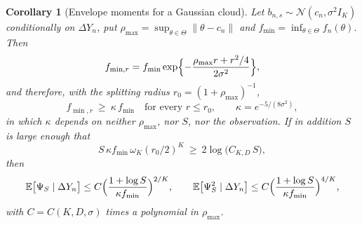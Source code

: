 \documentclass[11pt]{article}
\newtheorem{corollary}[corollary]{Corollary}
\theoremstyle{definition}
\newcommand{\E}{\mathbb{E}}
\newcommand{\Normal}{\mathcal{N}}
\begin{document}
\begin{corollary}[Envelope moments for a Gaussian cloud]\label{cor:envelope_moments}
Let $b_{n,s}\sim\Normal(c_n,\sigma^2I_K)$ conditionally on $\Delta Y_n$, put $\rho_{\max}=\sup_{\theta\in\Theta}\lVert\theta-c_n\rVert$ and $f_{\min}=\inf_{\theta\in\Theta}f_n(\theta)$. Then
\begin{equation}\label{eq:covering_gaussian}
f_{\min,r}=f_{\min}\exp\Bigl\{-\frac{\rho_{\max}r+r^2/4}{2\sigma^2}\Bigr\} ,
\end{equation}
and therefore, with the splitting radius $r_0=(1+\rho_{\max})^{-1}$,
\begin{equation}\label{eq:covering_kappa}
f_{\min,r}\ \ge\ \kappa\,f_{\min}\quad\text{for every }r\le r_0,
\qquad
\kappa=e^{-5/(8\sigma^2)} ,
\end{equation}
in which $\kappa$ depends on neither $\rho_{\max}$, nor $S$, nor the observation. If in addition $S$ is large enough that
\begin{equation}\label{eq:covering_regime}
S\,\kappa f_{\min}\,\omega_K(r_0/2)^K\ \ge\ 2\log\bigl(C_{K,D}\,S\bigr),
\end{equation}
then
\begin{equation}\label{eq:envelope_moment}
\E\bigl[\Psi_S\mid\Delta Y_n\bigr]\le C\Bigl(\frac{1+\log S}{\kappa f_{\min}}\Bigr)^{2/K},
\qquad
\E\bigl[\Psi_S^2\mid\Delta Y_n\bigr]\le C\Bigl(\frac{1+\log S}{\kappa f_{\min}}\Bigr)^{4/K},
\end{equation}
with $C=C(K,D,\sigma)$ times a polynomial in $\rho_{\max}$.
\end{corollary}
\end{document}
